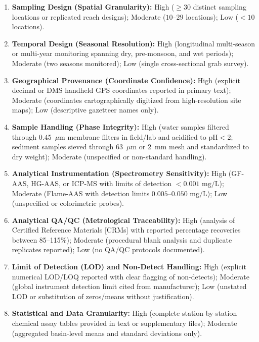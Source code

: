 \documentclass[authoryear,preprint,12pt]{elsarticle}
\begin{document}
\begin{enumerate}
    \item \textbf{Sampling Design (Spatial Granularity):} High ($\ge 30$ distinct sampling locations or replicated reach designs); Moderate ($10\text{--}29$ locations); Low ($<10$ locations).
    \item \textbf{Temporal Design (Seasonal Resolution):} High (longitudinal multi-season or multi-year monitoring spanning dry, pre-monsoon, and wet periods); Moderate (two seasons monitored); Low (single cross-sectional grab survey).
    \item \textbf{Geographical Provenance (Coordinate Confidence):} High (explicit decimal or DMS handheld GPS coordinates reported in primary text); Moderate (coordinates cartographically digitized from high-resolution site maps); Low (descriptive gazetteer names only).
    \item \textbf{Sample Handling (Phase Integrity):} High (water samples filtered through 0.45~$\mu\text{m}$ membrane filters in field/lab and acidified to $\text{pH} < 2$; sediment samples sieved through 63~$\mu\text{m}$ or 2~mm mesh and standardized to dry weight); Moderate (unspecified or non-standard handling).
    \item \textbf{Analytical Instrumentation (Spectrometry Sensitivity):} High (GF-AAS, HG-AAS, or ICP-MS with limits of detection $<0.001\text{ mg/L}$); Moderate (Flame-AAS with detection limits $0.005\text{--}0.050\text{ mg/L}$); Low (unspecified or colorimetric probes).
    \item \textbf{Analytical QA/QC (Metrological Traceability):} High (analysis of Certified Reference Materials [CRMs] with reported percentage recoveries between 85--115\%); Moderate (procedural blank analysis and duplicate replicates reported); Low (no QA/QC protocols documented).
    \item \textbf{Limit of Detection (LOD) and Non-Detect Handling:} High (explicit numerical LOD/LOQ reported with clear flagging of non-detects); Moderate (global instrument detection limit cited from manufacturer); Low (unstated LOD or substitution of zeros/means without justification).
    \item \textbf{Statistical and Data Granularity:} High (complete station-by-station chemical assay tables provided in text or supplementary files); Moderate (aggregated basin-level means and standard deviations only).
\end{enumerate}
\end{document}
